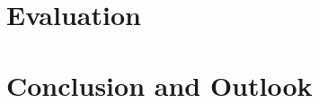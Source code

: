 \documentclass{listhesis}
\begin{document}
\chapter{Evaluation}

\chapter{Conclusion and Outlook}


\cleardoublepage



\confirmation
\end{document}
